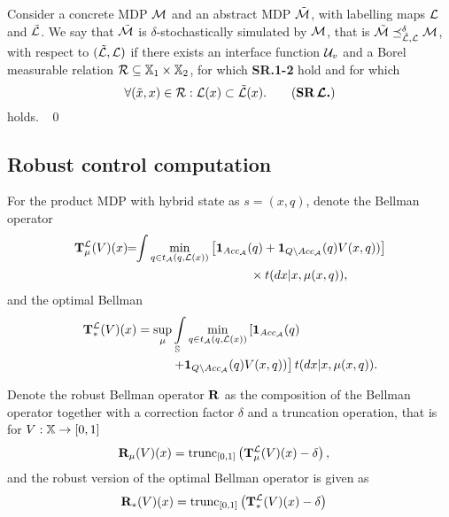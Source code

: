 \documentclass{ifacconf}
\begin{document}
\begin{definition}\label{def:apbsim}
Consider a concrete MDP $\mathcal{M}$ and an abstract  MDP $\tilde{\mathcal{M}}$, with labelling maps $\mathcal{L}$ and  $\tilde{\mathcal{L}}$.   
We say that	$\tilde{\mathcal{M}}$ is $\delta$-stochastically simulated by $\mathcal{M}$, that is $\tilde{\mathcal{M}}\preceq^{\delta}_{\tilde{\mathcal{L}},\mathcal{L}}\mathcal{M}$, with respect to $(\tilde{\mathcal{L}},\mathcal{L})$  if there exists an interface function $\mathcal{U}_{v}$ and
	a Borel measurable relation $\mathcal{R}\subseteq {\mathbb{X}}_1\times {\mathbb{X}}_2$, for which \textbf{SR.1-2} hold and for which 	\begin{equation}
	  \forall (\tilde x,x)\in \rel:  \Labset(x)\subset \tilde{\Labset}(x).
\tag{\textbf{SR$\,\boldsymbol{\CA{L}}$.}}
	\end{equation} 
holds. \hfill\mbox{ }\qed
\end{definition}





\subsection{Robust control computation}

For the product MDP with hybrid state as $s=(x, q)$, denote the Bellman operator
\begin{align}\label{eq:V_recopt_inf}
& \Bel_\pol^\Labset (V)(x) \!\!=\!\!\int%
\min_{\bar q \in t_\FSA(q, \Labset(\bar x))}\left[\mathbf 1_{Acc_\FSA}(\bar q)+  \mathbf 1_{Q\setminus Acc_\FSA}(\bar q)V(\bar x,\bar q))\right]\notag\\&\hspace{5cm}\hfill \times{\tr}(d\bar x|x,\pol(x,q)),
\end{align}
and the optimal Bellman 
\begin{align}\label{eq:V_recopt_inf}
& \Bel_\ast^\Labset (V)(x) =\sup_\pol\int_{\S}\min_{\bar q \in t_\FSA(q, \Labset(\bar x))}\left[\mathbf 1_{Acc_\FSA}(\bar q)\right.\hspace{1.5cm}\\&\left.\hspace{2.5cm}+  \mathbf 1_{Q\setminus Acc_\FSA}(\bar q)V(\bar x,\bar q))\right]\notag {\tr}(d\bar x|x,\pol(x,q)).
\end{align}



Denote the robust Bellman operator ${\mathbf {R}}$ as the composition of the Bellman operator together with a correction factor $\delta$ and  a truncation operation, that is for $V:{\mathbb{X}}\rightarrow [0,1]$
\begin{align}\label{eq:V_recopt_inf}
& {\mathbf {R}}_{\mu} (V)(x) = \mathop{\mathrm{trunc}}\nolimits_{[0,1]}\left({\mathbf {T}}_{\mu}^{\mathcal{L}} (V)(x)-\delta\right),
\end{align}
and the robust version of the optimal Bellman operator is given as 
\begin{align}\label{eq:V_recopt_inf}
& {\mathbf {R}}_\ast (V)(x)= \mathop{\mathrm{trunc}}\nolimits_{[0,1]}\left({\mathbf {T}}_\ast^{\mathcal{L}} (V)(x)-\delta\right)
\end{align}
\end{document}
